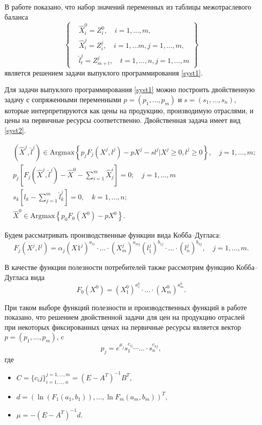 \documentclass[12pt, a4paper]{article}
\begin{document}
В работе 
\cite{RassShan} 
показано, что набор значений переменных из таблицы межотраслевого баланса 
$$
\left\{
\begin{aligned}
&\hat{X}_i^0 = Z_i^0,\quad i = 1,\ldots, m,\\
&\hat{X}_i^j = Z_i^j,\quad i = 1,\ldots m, j=1,\ldots,m,\\
&\hat{l}_t^j = Z_{m+t}^j, \quad t = 1, \ldots, n, j = 1,\ldots, m
\end{aligned}
\right\}
$$
является решением задачи выпуклого программирования \eqref{syst1}.

Для задачи выпуклого программирования \eqref{syst1} можно построить двойственную задачу с сопряженными переменными $p = (p_1, \ldots, p_m)$ и $s = (s_1, \ldots, s_n)$, которые интерпретируются как цены на продукцию, производимую отраслями, и цены на первичные ресурсы соответственно. Двойственная задача имеет вид \eqref{syst2}.

\begin{equation}\label{syst2}
\begin{aligned}
&(\hat{X}^j, \hat{l}^j) \in \text{Argmax}\left\{p_jF_j(X^j, l^j) - p X^j - sl^j \Biggl|X^j \geq 0, l^j \geq 0\right\},\quad j = 1,\ldots, m;\\
&p_j\left[F_j(\hat{X}^j, \hat{l}^j) - \hat{X}^0 - \sum\limits_{i=1}^{m}\hat{X}^i_j\right] = 0;\quad j=1,\ldots, m\\
&s_k\left[l_k - \sum\limits_{j=1}^m \hat{l}^j_k\right] = 0,\quad k = 1,\ldots,n;\\
&\hat{X}^0 \in \text{Argmax}\left\{p_0F_0(X^0) - pX^0\right\}.
\end{aligned}
\end{equation}

Будем рассматривать производственные функции вида Кобба--Дугласа:
$$
F_j(X^j, l^j) = \alpha_j (X1^j)^{a_{1i}}\cdot \ldots \cdot (X_m^j)^{a_{mj}}(l_1^j)^{b_{1j}}\cdot \ldots \cdot (l_n^j)^{b_{nj}}, \quad j = 1, \ldots, m.
$$

В качестве функции полезности потребителей также рассмотрим функцию Кобба--Дугласа вида 
$$
F_0(X^0) = (X^0_1)^{a_1^0}\cdot \ldots \cdot (X_m^0)^{a^0_m}.
$$

При таком выборе функций полезности и производственных функций в работе 
\cite{RassShan} 
показано, что решением двойственной задачи для цен на продукцию отраслей при некоторых фиксированных ценах на первичные ресурсы является вектор $p = (p_1, \ldots, p_m)$, c
$$
p_j = e^{\mu_j} s_1^{c_{ij}}\cdots \ldots \cdot s_n^{c_{nj}},
$$
где\begin{itemize}
\item $C = \{c_ij\}_{i = 1,\ldots,n}^{j = 1, \ldots, m} = (E - A^T)^{-1}B^T,$ 
\item $d = (\ln(F_1(a_1, b_1)), \ldots, \ln F_m(a_m, b_m))^T,$
\item $\mu = -(E - A^T)^{-1}d$.
\end{itemize} 
\end{document}

